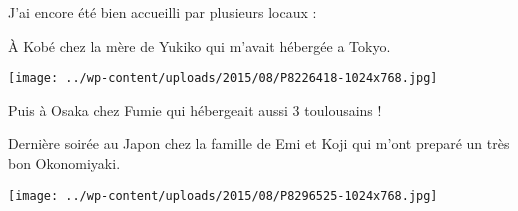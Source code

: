   J'ai encore été bien accueilli par plusieurs locaux :
\vfill

 \`A Kobé chez la mère de Yukiko qui m'avait hébergée a Tokyo.
 \vfill
\begin{center} \texttt{[image: ../wp-content/uploads/2015/08/P8226418-1024x768.jpg]} \end{center}
\vfill

 Puis à Osaka chez Fumie qui hébergeait aussi 3 toulousains ! 
\vfill

 Dernière soirée au Japon chez la famille de Emi et Koji qui m'ont preparé un très bon Okonomiyaki.
 \vfill
\begin{center} \texttt{[image: ../wp-content/uploads/2015/08/P8296525-1024x768.jpg]} \end{center}
\vspace{-\topsep}
\vspace{-0.75mm}